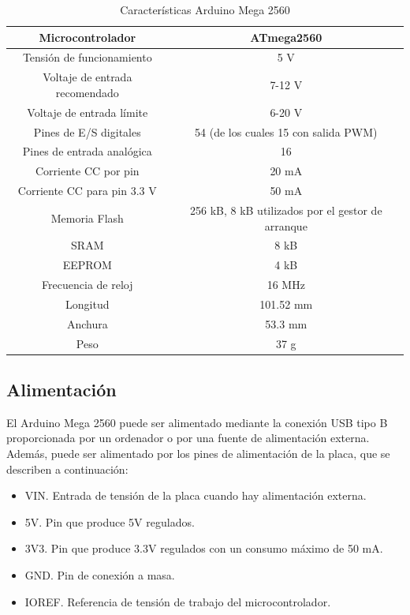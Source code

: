 \begin{table}[hbtp]
    \begin{center}
    \begin{tabular}{ | c | c |  }
    \hline
    Microcontrolador & ATmega2560 \\ \hline
    Tensión de funcionamiento & 5 V \\ \hline
    Voltaje de entrada recomendado & 7-12 V \\ \hline
    Voltaje de entrada límite & 6-20 V \\ \hline
    Pines de E/S digitales & 54 (de los cuales 15 con salida PWM) \\ \hline
    Pines de entrada analógica & 16 \\ \hline
    Corriente CC por pin & 20 mA \\ \hline
    Corriente CC para pin 3.3 V & 50 mA \\ \hline
    Memoria Flash & 256 kB, 8 kB utilizados por el gestor de arranque \\ \hline
    SRAM & 8 kB \\ \hline
    EEPROM & 4 kB \\ \hline
    Frecuencia de reloj & 16 MHz \\ \hline
    Longitud & 101.52 mm \\ \hline
    Anchura & 53.3 mm \\ \hline
    Peso & 37 g \\ \hline

    \end{tabular}
    \end{center}
    \caption{Características Arduino Mega 2560}
    \label{tab:tab1}
    \end{table}


\subsection{Alimentación}

El Arduino Mega 2560 puede ser alimentado mediante la conexión USB tipo B proporcionada por
un ordenador o por una fuente de alimentación externa. Además, puede ser alimentado por los pines
de alimentación de la placa, que se describen a continuación:

\begin{itemize}
    \item VIN. Entrada de tensión de la placa cuando hay alimentación externa.
    \item 5V. Pin que produce 5V regulados.
    \item 3V3. Pin que produce 3.3V regulados con un consumo máximo de 50 mA.
    \item GND. Pin de conexión a masa.
    \item IOREF. Referencia de tensión de trabajo del microcontrolador.
\end{itemize}

